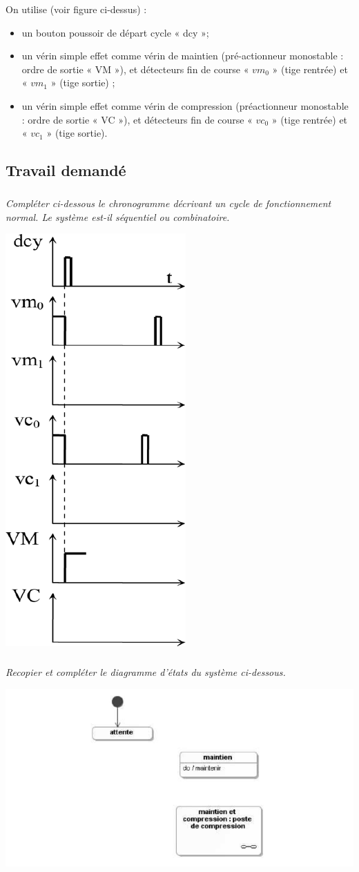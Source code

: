 \documentclass[10pt]{article}
\begin{document}
On utilise (voir figure ci-dessus) :
\begin{itemize}
\item un bouton poussoir de départ cycle « dcy »;
\item un vérin simple effet comme vérin de maintien (pré-actionneur monostable : ordre de sortie
« VM »), et détecteurs fin de course « $vm_0$ » (tige rentrée) et « $vm_1$ » (tige sortie) ;
\item un vérin simple effet comme vérin de compression (préactionneur monostable : ordre de
sortie « VC »), et détecteurs fin de course « $vc_0$ » (tige rentrée) et « $vc_1$ » (tige sortie).
\end{itemize}

\subsection*{Travail demandé}
\subparagraph{}
\textit{Compléter ci-dessous le chronogramme décrivant un cycle de fonctionnement normal. Le
système est-il séquentiel ou combinatoire.}


\begin{center}
\includegraphics[width=.3\textwidth]{images/fig_12}
\end{center}

\subparagraph{}
\textit{Recopier et compléter le diagramme d’états du système ci-dessous.}


\begin{center}
\includegraphics[width=.75\textwidth]{images/fig_13}
\end{center}
\end{document}

